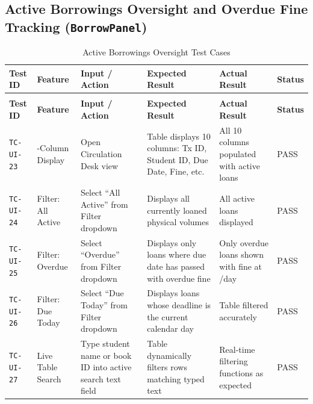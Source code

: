 \subsection{Active Borrowings Oversight and Overdue Fine Tracking (\texttt{BorrowPanel})}
{\footnotesize
\setlength{\tabcolsep}{3pt}
\begin{longtable}{>{\raggedright\arraybackslash}p{1.6cm} >{\raggedright\arraybackslash}p{2.1cm} >{\raggedright\arraybackslash}p{2.5cm} >{\raggedright\arraybackslash}p{3.1cm} >{\raggedright\arraybackslash}p{3.1cm} >{\centering\arraybackslash}p{1.4cm}}
\caption{Active Borrowings Oversight Test Cases} \label{tab:test_ui_active} \\
\toprule
\textbf{Test ID} & \textbf{Feature} & \textbf{Input / Action} & \textbf{Expected Result} & \textbf{Actual Result} & \textbf{Status} \\
\midrule
\endfirsthead
\multicolumn{6}{c}{{\bfseries Table \thetable\ continued from previous page}} \\
\toprule
\textbf{Test ID} & \textbf{Feature} & \textbf{Input / Action} & \textbf{Expected Result} & \textbf{Actual Result} & \textbf{Status} \\
\midrule
\endhead
\bottomrule
\endfoot
\texttt{TC-UI-23} & 10-Column Display & Open Circulation Desk view & Table displays 10 columns: Tx ID, Student ID, Due Date, Fine, etc. & All 10 columns populated with active loans & PASS \\
\midrule
\texttt{TC-UI-24} & Filter: All Active & Select ``All Active'' from Filter dropdown & Displays all currently loaned physical volumes & All active loans displayed & PASS \\
\midrule
\texttt{TC-UI-25} & Filter: Overdue & Select ``Overdue'' from Filter dropdown & Displays only loans where due date has passed with overdue fine & Only overdue loans shown with fine at \rupee 10/day & PASS \\
\midrule
\texttt{TC-UI-26} & Filter: Due Today & Select ``Due Today'' from Filter dropdown & Displays loans whose deadline is the current calendar day & Table filtered accurately & PASS \\
\midrule
\texttt{TC-UI-27} & Live Table Search & Type student name or book ID into active search text field & Table dynamically filters rows matching typed text & Real-time filtering functions as expected & PASS \\
\end{longtable}
}

